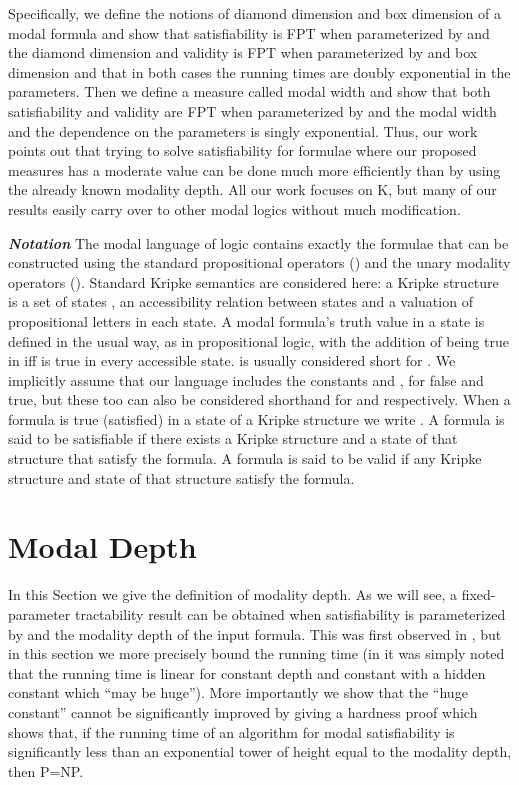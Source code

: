 \documentclass{llncs}
\begin{document}
Specifically, we define the notions of diamond dimension and box
dimension of a modal formula and show that satisfiability is FPT
when parameterized by  and the diamond dimension and validity is
FPT when parameterized by  and box dimension and that in both
cases the running times are doubly exponential in the parameters.
Then we define a measure called modal width and show that both
satisfiability and validity are FPT when parameterized by  and
the modal width and the dependence on the parameters is singly
exponential. Thus, our work points out that trying to solve satisfiability for
formulae where our proposed measures has a moderate value can be done much more
efficiently than by using the already known modality depth. All our work
focuses on K, but many of our results easily carry over to other modal logics
without much modification.



\textit{\textbf{Notation}}
The modal language of logic  contains exactly the formulae that can be
constructed using the standard propositional operators () and
the unary modality operators ().  Standard Kripke semantics are
considered here: a Kripke structure is a set of states , an accessibility
relation  between states and a valuation of propositional letters in each
state. A modal formula's truth value in a state is defined in the usual way, as
in propositional logic, with the addition of  being true in  iff
 is true in every accessible state.   is usually
considered short for .  We implicitly assume that our
language includes the constants  and , for false and true, but
these too can also be considered shorthand for  and  respectively. When a formula  is true (satisfied) in a state  of a Kripke
structure  we write . A formula  is said to be satisfiable if there exists a Kripke structure  and a state  of that structure that satisfy the formula.
A formula  is said to be valid if any Kripke structure  and state  of that structure satisfy the formula.





\section{Modal Depth} \label{sec:depth}

In this Section we give the definition of modality depth. As we will see, a
fixed-parameter tractability result can be obtained when satisfiability is
parameterized by  and the modality depth of the input formula.  This was
first observed in \cite{DBLP:journals/ai/Halpern95}, but in this section we
more precisely bound the running time (in \cite{DBLP:journals/ai/Halpern95} it
was simply noted that the running time is linear for constant depth and
constant  with a hidden constant which ``may be huge''). More importantly we
show that the ``huge constant'' cannot be significantly improved by giving a
hardness proof which shows that, if the running time of an algorithm for modal
satisfiability is significantly less than an exponential tower of height equal
to the modality depth, then P=NP.
\end{document}
